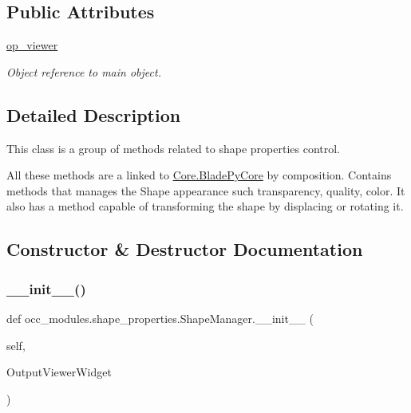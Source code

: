 \subsection*{Public Attributes}
\begin{DoxyCompactItemize}
\item 
\hyperlink{a00094_ad60197d66a3c059f30f32c2ab1a12841}{op\+\_\+viewer}
\begin{DoxyCompactList}\small\item\em Object reference to main object. \end{DoxyCompactList}\end{DoxyCompactItemize}


\subsection{Detailed Description}
This class is a group of methods related to shape properties control. 

All these methods are a linked to \hyperlink{a00078}{Core.\+Blade\+Py\+Core} by composition. Contains methods that manages the Shape appearance such transparency, quality, color. It also has a method capable of transforming the shape by displacing or rotating it. 

\subsection{Constructor \& Destructor Documentation}
\hypertarget{a00094_aeafd1ea7cbe63a409e51e546db403bfd}{}\label{a00094_aeafd1ea7cbe63a409e51e546db403bfd} 
\subsubsection{\texorpdfstring{\+\_\+\+\_\+init\+\_\+\+\_\+()}{\_\_init\_\_()}}
{\footnotesize\ttfamily def occ\+\_\+modules.\+shape\+\_\+properties.\+Shape\+Manager.\+\_\+\+\_\+init\+\_\+\+\_\+ (\begin{DoxyParamCaption}\item[{}]{self,  }\item[{}]{Output\+Viewer\+Widget }\end{DoxyParamCaption})}



